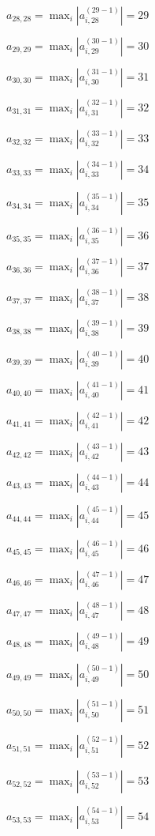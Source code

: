 \documentclass[a4paper,12pt]{article}
\begin{document}
$a _{ 28, 28 } =  \max _i |a _{ i, 28 } ^{ (29 - 1) } | = 29$

$a _{ 29, 29 } =  \max _i |a _{ i, 29 } ^{ (30 - 1) } | = 30$

$a _{ 30, 30 } =  \max _i |a _{ i, 30 } ^{ (31 - 1) } | = 31$

$a _{ 31, 31 } =  \max _i |a _{ i, 31 } ^{ (32 - 1) } | = 32$

$a _{ 32, 32 } =  \max _i |a _{ i, 32 } ^{ (33 - 1) } | = 33$

$a _{ 33, 33 } =  \max _i |a _{ i, 33 } ^{ (34 - 1) } | = 34$

$a _{ 34, 34 } =  \max _i |a _{ i, 34 } ^{ (35 - 1) } | = 35$

$a _{ 35, 35 } =  \max _i |a _{ i, 35 } ^{ (36 - 1) } | = 36$

$a _{ 36, 36 } =  \max _i |a _{ i, 36 } ^{ (37 - 1) } | = 37$

$a _{ 37, 37 } =  \max _i |a _{ i, 37 } ^{ (38 - 1) } | = 38$

$a _{ 38, 38 } =  \max _i |a _{ i, 38 } ^{ (39 - 1) } | = 39$

$a _{ 39, 39 } =  \max _i |a _{ i, 39 } ^{ (40 - 1) } | = 40$

$a _{ 40, 40 } =  \max _i |a _{ i, 40 } ^{ (41 - 1) } | = 41$

$a _{ 41, 41 } =  \max _i |a _{ i, 41 } ^{ (42 - 1) } | = 42$

$a _{ 42, 42 } =  \max _i |a _{ i, 42 } ^{ (43 - 1) } | = 43$

$a _{ 43, 43 } =  \max _i |a _{ i, 43 } ^{ (44 - 1) } | = 44$

$a _{ 44, 44 } =  \max _i |a _{ i, 44 } ^{ (45 - 1) } | = 45$

$a _{ 45, 45 } =  \max _i |a _{ i, 45 } ^{ (46 - 1) } | = 46$

$a _{ 46, 46 } =  \max _i |a _{ i, 46 } ^{ (47 - 1) } | = 47$

$a _{ 47, 47 } =  \max _i |a _{ i, 47 } ^{ (48 - 1) } | = 48$

$a _{ 48, 48 } =  \max _i |a _{ i, 48 } ^{ (49 - 1) } | = 49$

$a _{ 49, 49 } =  \max _i |a _{ i, 49 } ^{ (50 - 1) } | = 50$

$a _{ 50, 50 } =  \max _i |a _{ i, 50 } ^{ (51 - 1) } | = 51$

$a _{ 51, 51 } =  \max _i |a _{ i, 51 } ^{ (52 - 1) } | = 52$

$a _{ 52, 52 } =  \max _i |a _{ i, 52 } ^{ (53 - 1) } | = 53$

$a _{ 53, 53 } =  \max _i |a _{ i, 53 } ^{ (54 - 1) } | = 54$
\end{document}
